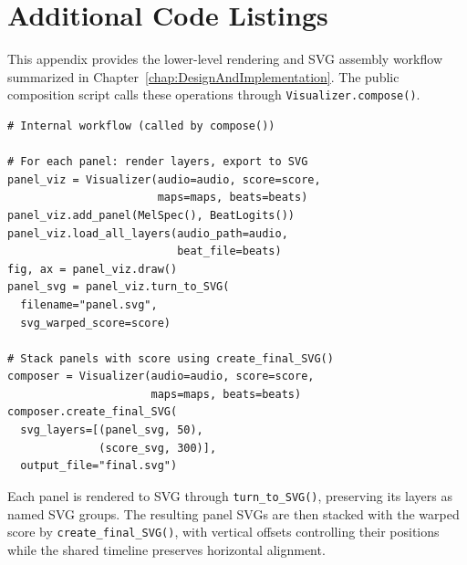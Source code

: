 \chapter{Additional Code Listings}\label{appendix:code-listings}

This appendix provides the lower-level rendering and SVG assembly workflow summarized in Chapter~\ref{chap:DesignAndImplementation}. The public composition script calls these operations through \texttt{Visualizer.compose()}.

\begin{lstlisting}[caption={Internal SVG composition workflow},label={lst:svg-layers-example}]
# Internal workflow (called by compose())

# For each panel: render layers, export to SVG
panel_viz = Visualizer(audio=audio, score=score,
                       maps=maps, beats=beats)
panel_viz.add_panel(MelSpec(), BeatLogits())
panel_viz.load_all_layers(audio_path=audio,
                          beat_file=beats)
fig, ax = panel_viz.draw()
panel_svg = panel_viz.turn_to_SVG(
  filename="panel.svg",
  svg_warped_score=score)

# Stack panels with score using create_final_SVG()
composer = Visualizer(audio=audio, score=score,
                      maps=maps, beats=beats)
composer.create_final_SVG(
  svg_layers=[(panel_svg, 50),
              (score_svg, 300)],
  output_file="final.svg")
\end{lstlisting}

Each panel is rendered to SVG through \texttt{turn\_to\_SVG()}, preserving its layers as named SVG groups. The resulting panel SVGs are then stacked with the warped score by \texttt{create\_final\_SVG()}, with vertical offsets controlling their positions while the shared timeline preserves horizontal alignment.